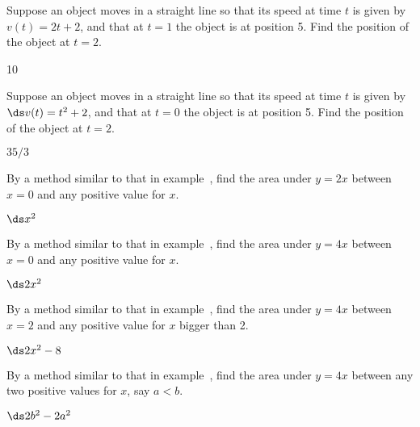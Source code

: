\begin{exercises}

\begin{exercise} Suppose an object moves in a straight line so that its speed at
time $t$ is given by $v(t)=2t+2$, and that at $t=1$ the object is at
position 5. Find the position of the object at $t=2$.
\begin{answer} 10
\end{answer}\end{exercise}

\begin{exercise} Suppose an object moves in a straight line so that its speed at
time $t$ is given by $\ds v(t)=t^2+2$, and that at $t=0$ the object is at
position 5. Find the position of the object at $t=2$.
\begin{answer} $35/3$
\end{answer}\end{exercise}

\begin{exercise} By a method similar to that in example~, find the area under $y=2x$ between $x=0$ and any
  positive value for $x$.
\begin{answer} $\ds x^2$
\end{answer}\end{exercise}

\begin{exercise} By a method similar to that in example~, find the area under $y=4x$ between $x=0$ and any
  positive value for $x$.
\begin{answer} $\ds 2x^2$
\end{answer}\end{exercise}

\begin{exercise} By a method similar to that in example~, find the area under $y=4x$ between $x=2$ and any
  positive value for $x$ bigger than 2.
\begin{answer} $\ds 2x^2-8$
\end{answer}\end{exercise}

\begin{exercise} By a method similar to that in example~, find the area under $y=4x$ between any two positive
  values for $x$, say $a<b$.
\begin{answer} $\ds 2b^2-2a^2$
\end{answer}\end{exercise}


\end{exercises}
